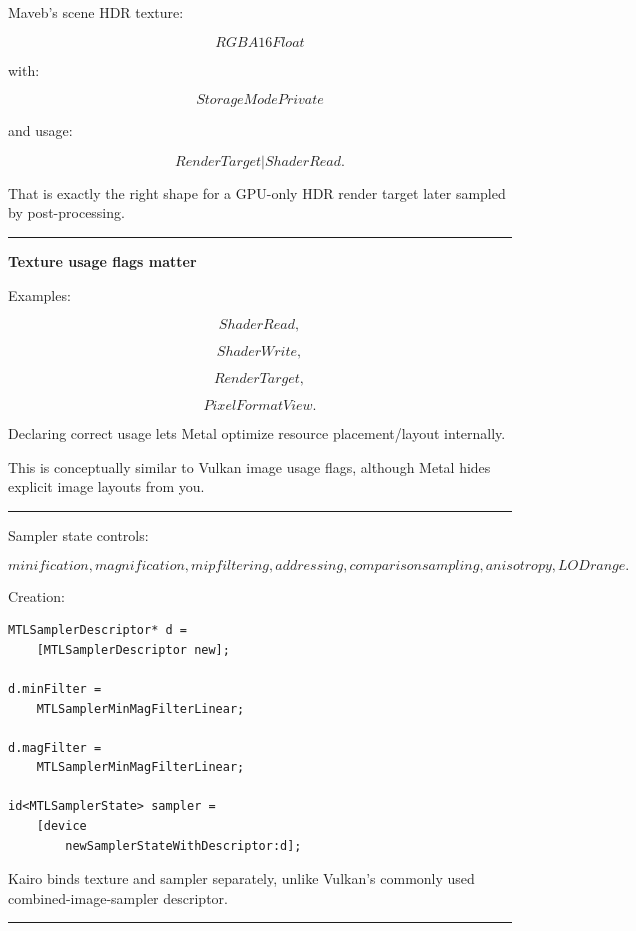 Maveb's scene HDR texture:

\[
RGBA16Float
\]

with:

\[
StorageModePrivate
\]

and usage:

\[
RenderTarget
|
ShaderRead.
\]

That is exactly the right shape for a GPU-only HDR render target later sampled by post-processing.

\begin{center}\rule{0.5\linewidth}{0.5pt}\end{center}

\textbf{Texture usage flags matter}

Examples:

\[
ShaderRead,
\]

\[
ShaderWrite,
\]

\[
RenderTarget,
\]

\[
PixelFormatView.
\]

Declaring correct usage lets Metal optimize resource placement/layout internally.

This is conceptually similar to Vulkan image usage flags, although Metal hides explicit image layouts from you.

\begin{center}\rule{0.5\linewidth}{0.5pt}\end{center}

\textbf{}

Sampler state controls:

\[
minification,
magnification,
mip filtering,
addressing,
comparison sampling,
anisotropy,
LOD range.
\]

Creation:

\begin{verbatim}
MTLSamplerDescriptor* d =
    [MTLSamplerDescriptor new];

d.minFilter =
    MTLSamplerMinMagFilterLinear;

d.magFilter =
    MTLSamplerMinMagFilterLinear;

id<MTLSamplerState> sampler =
    [device
        newSamplerStateWithDescriptor:d];
\end{verbatim}

Kairo binds texture and sampler separately, unlike Vulkan's commonly used combined-image-sampler descriptor.

\begin{center}\rule{0.5\linewidth}{0.5pt}\end{center}

